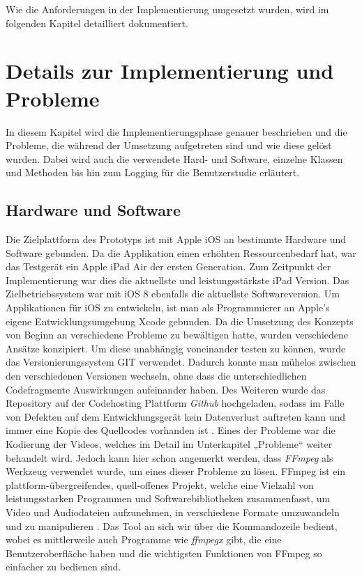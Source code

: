 \documentclass[11pt,a4paper]{report}
\begin{document}
Wie die Anforderungen in der Implementierung umgesetzt wurden, wird im folgenden Kapitel detailliert dokumentiert.

\section{Details zur Implementierung und Probleme}

In diesem Kapitel wird die Implementierungsphase genauer beschrieben und die Probleme, die während der Umsetzung aufgetreten sind und wie diese gelöst wurden. Dabei wird auch die verwendete Hard- und Software, einzelne Klassen und Methoden bis hin zum Logging für die Benutzerstudie erläutert.

\subsection{Hardware und Software}

Die Zielplattform des Prototyps ist mit Apple iOS an bestimmte Hardware und Software gebunden. Da die Applikation einen erhöhten Ressourcenbedarf hat, war das Testgerät ein Apple iPad Air der ersten Generation. Zum Zeitpunkt der Implementierung war dies die aktuellste und leistungsstärkste iPad Version. Das Zielbetriebssystem war mit iOS 8 ebenfalls die aktuellste Softwareversion. Um Applikationen für iOS zu entwickeln, ist man als Programmierer an Apple’s eigene Entwicklungsumgebung Xcode gebunden. Da die Umsetzung des Konzepts von Beginn an verschiedene Probleme zu bewältigen hatte, wurden verschiedene Ansätze konzipiert. Um diese unabhängig voneinander testen zu können, wurde das Versionierungssystem GIT verwendet. Dadurch konnte man mühelos zwischen den verschiedenen Versionen wechseln, ohne dass die unterschiedlichen Codefragmente Auswirkungen aufeinander haben. Des Weiteren wurde das Repository auf der Codehosting Plattform \textit{Github}  hochgeladen, sodass im Falle von Defekten auf dem Entwicklungsgerät kein Datenverlust auftreten kann und immer eine Kopie des Quellcodes vorhanden ist \cite{GithubLandingPage}. Eines der Probleme war die Kodierung der Videos, welches im Detail im Unterkapitel „Probleme“ weiter behandelt wird. Jedoch kann hier schon angemerkt werden, dass \textit{FFmpeg}  als Werkzeug verwendet wurde, um eines dieser Probleme zu lösen. FFmpeg ist ein plattform-übergreifendes, quell-offenes Projekt, welche eine Vielzahl von leistungsstarken Programmen und Softwarebibliotheken zusammenfasst, um Video und Audiodateien aufzunehmen, in verschiedene Formate umzuwandeln und zu manipulieren \cite{FFmpegLandingPage}. Das Tool an sich wir über die Kommandozeile bedient, wobei es mittlerweile auch Programme wie \textit{ffmpegx} gibt, die eine Benutzeroberfläche haben und die wichtigsten Funktionen von FFmpeg so einfacher zu bedienen sind. \cite{granneman2010mac}
\end{document}
